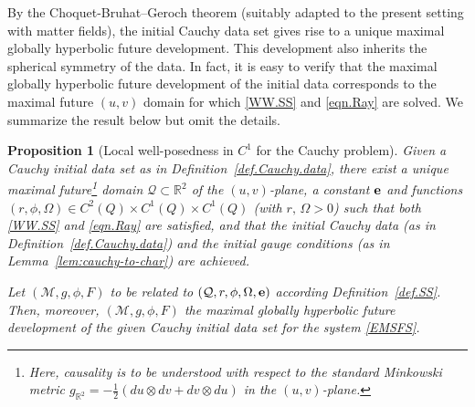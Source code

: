\documentclass[10pt, reqno]{amsart}
\newtheorem{proposition}[theorem]{Proposition}
\theoremstyle{definition}
\theoremstyle{remark}
\numberwithin{equation}{section}
\newcommand{\ud}{d}
\newcommand{\rd}{\partial}
\newcommand{\0}{\emptyset}
\newcommand{\Omg}{\Omega}
\newcommand{\bfe}{{\bf e}}
\newcommand{\f}{\frac}
\newcommand{\e}{\bfe}							%
\begin{document}
%

By the Choquet-Bruhat--Geroch theorem \cite{CBG} (suitably adapted to the present setting with matter fields), the initial Cauchy data set gives rise to a unique maximal globally hyperbolic future development. This development also inherits the spherical symmetry of the data. In fact, it is easy to verify that the maximal globally hyperbolic future development of the initial data corresponds to the maximal future $(u,v)$ domain for which \eqref{WW.SS} and \eqref{eqn.Ray} are solved. We summarize the result below but omit the details.

\begin{proposition}[Local well-posedness in $C^1$ for the Cauchy problem]\label{prop.LWP}
Given a Cauchy initial data set as in Definition~\ref{def.Cauchy.data}, there exist a unique maximal future\footnote{Here, causality is to be understood with respect to the standard Minkowski metric $g_{\mathbb R^2} = -\f 12(\ud u\otimes \ud v + \ud v \otimes \ud u)$ in the $(u,v)$-plane.} domain $\mathcal Q\subset \mathbb R^2$ of the $(u,v)$-plane, a constant $\e$ and functions $(r,\phi,\Omg)\in C^2(Q)\times C^1(Q)\times C^1(Q)$ (with $r,\,\Omg>0$) such that both \eqref{WW.SS} and \eqref{eqn.Ray} are satisfied, and that the initial Cauchy data (as in Definition~\ref{def.Cauchy.data}) and the initial gauge conditions (as in Lemma~\ref{lem:cauchy-to-char}) are achieved.

Let $(\mathcal M, g, \phi, F)$ to be related to $(\mathcal Q, r, \phi, \Omg, \e)$ according Definition~\ref{def.SS}. Then, moreover, $(\mathcal M, g, \phi, F)$ the maximal globally hyperbolic future development of the given Cauchy initial data set for the system \eqref{EMSFS}.
\end{proposition}
\end{document}
